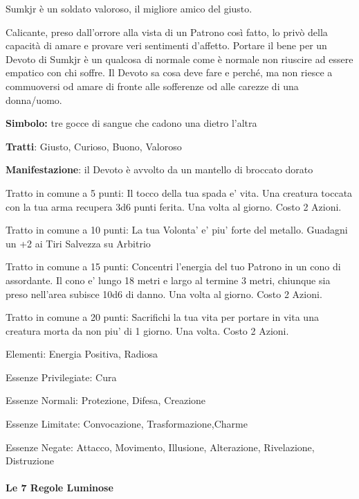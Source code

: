 \documentclass[a4paper,11pt,twoside,openany]{book}
\begin{document}
{Sumkjr è un soldato valoroso, il migliore amico del giusto.

Calicante, preso dall'orrore alla vista di un Patrono così fatto, lo privò della capacità di amare e provare veri sentimenti d'affetto. Portare il bene per un Devoto di Sumkjr è un qualcosa di normale come è normale non riuscire ad essere empatico con chi soffre. Il Devoto sa cosa deve fare e perché, ma non riesce a commuoversi od amare di fronte alle sofferenze od alle carezze di una donna/uomo.

\textbf{Simbolo:} tre gocce di sangue che cadono una dietro l'altra

\textbf{Tratti}: Giusto, Curioso, Buono, Valoroso

\textbf{Manifestazione}: il Devoto è avvolto da un mantello di broccato dorato

\bigskip

Tratto in comune a 5 punti: Il tocco della tua spada e’ vita. Una creatura toccata con la tua arma recupera 3d6 punti ferita. Una volta al giorno. Costo 2 Azioni. 

Tratto in comune a 10 punti: La tua Volonta’ e’ piu’ forte del metallo. Guadagni un +2 ai Tiri Salvezza su Arbitrio

Tratto in comune a 15 punti: Concentri l’energia del tuo Patrono in un cono di assordante. Il cono e’ lungo 18 metri e largo al termine 3 metri, chiunque sia preso nell’area subisce 10d6 di danno. 
Una volta al giorno. Costo 2 Azioni.

Tratto in comune a 20 punti: Sacrifichi la tua vita per portare in vita una creatura morta da non piu’ di 1 giorno. Una volta. Costo 2 Azioni.

\bigskip

Elementi: Energia Positiva, Radiosa

\bigskip

Essenze Privilegiate: Cura

Essenze Normali: Protezione, Difesa, Creazione

Essenze Limitate: Convocazione, Trasformazione,Charme

Essenze Negate: Attacco, Movimento, Illusione, Alterazione, Rivelazione, Distruzione

\bigskip

\paragraph{Le 7 Regole Luminose}

\label{le-7-regole-luminose}

}
\end{document}
